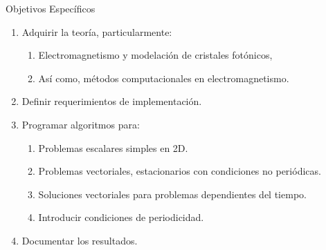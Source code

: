\documentclass[xcolor=table,serif]{beamer}
\begin{document}
		\begin{frame}
		\begin{block}{Objetivos Espec\'ificos}
	    \begin{enumerate}
			\item Adquirir la teoría, particularmente:
			\begin{enumerate}
				\item Electromagnetismo y modelación de cristales fotónicos, 
	 			\item Así como, métodos computacionales en  electromagnetismo.
	 		\end{enumerate}
			\item Definir requerimientos de implementación. 
			\item Programar algoritmos para:
				\begin{enumerate}
					\item Problemas escalares simples en 2D.	
					\item Problemas vectoriales, estacionarios con condiciones no periódicas.
					\item Soluciones vectoriales para problemas dependientes del tiempo.
					\item Introducir condiciones de periodicidad.
				\end{enumerate}
			\item Documentar los resultados.
		\end{enumerate}
		\end{block}
	\end{frame}
\end{document}
